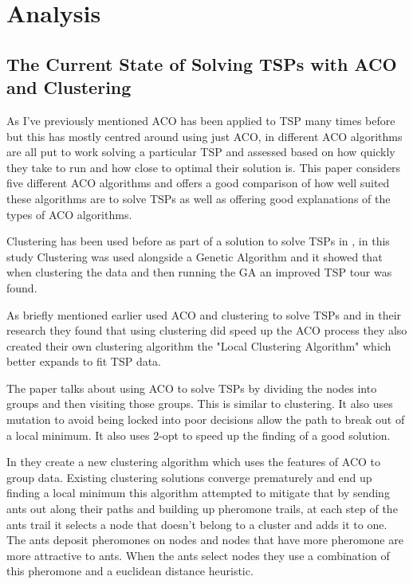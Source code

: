 \section{Analysis}

\subsection{The Current State of Solving TSPs with ACO and Clustering}
As I've previously mentioned ACO has been applied to TSP many times before but this has mostly centred around using just ACO, in \cite{assesmentdiffacofortsp} different ACO algorithms are all put to work solving a particular TSP and assessed based on how quickly they take to run and how close to optimal their solution is. This paper considers five different ACO algorithms and offers a good comparison of how well suited these algorithms are to solve TSPs as well as offering good explanations of the types of ACO algorithms. 

Clustering has been used before as part of a solution to solve TSPs in \cite{clustering_with_local_search_heuristic}, in this study Clustering was used alongside a Genetic Algorithm and it showed that when clustering the data and then running the GA an improved TSP tour was found.

As briefly mentioned earlier \cite{pang_chao-yang_ben-qiong_zhang_jie_wei_shan_zheng-chao_2014} used ACO and clustering to solve TSPs and in their research they found that using clustering did speed up the ACO process they also created their own clustering algorithm the "Local Clustering Algorithm" which better expands to fit TSP data. 

The paper \cite{yang_shi_marchese_liang_2008} talks about using ACO to solve TSPs by dividing the nodes into groups and then visiting those groups. This is similar to clustering. It also uses mutation to avoid being locked into poor decisions allow the path to break out of a local minimum. It also uses 2-opt to speed up the finding of a good solution.

In \cite{10.1007/11839088_31} they create a new clustering algorithm which uses the features of ACO to group data. Existing clustering solutions converge prematurely and end up finding a local minimum this algorithm attempted to mitigate that by sending ants out along their paths and building up pheromone trails, at each step of the ants trail it selects a node that doesn't belong to a cluster and adds it to one. The ants deposit pheromones on nodes and nodes that have more pheromone are more attractive to ants. When the ants select nodes they use a combination of this pheromone and a euclidean distance heuristic. 

